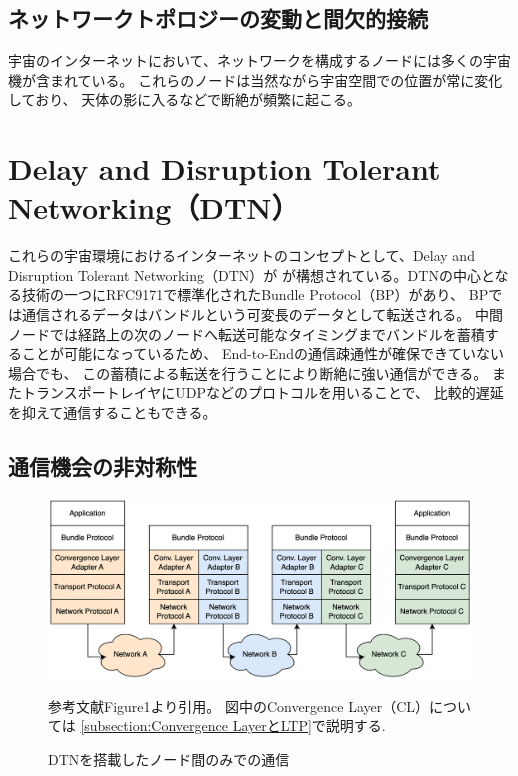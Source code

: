 \subsection{ネットワークトポロジーの変動と間欠的接続}
\label{subsection:ネットワークトポロジーの変動と間欠的接続}
宇宙のインターネットにおいて、ネットワークを構成するノードには多くの宇宙機が含まれている。
これらのノードは当然ながら宇宙空間での位置が常に変化しており、
 天体の影に入るなどで断絶が頻繁に起こる。 

\section{Delay and Disruption Tolerant Networking（DTN）}
これらの宇宙環境におけるインターネットのコンセプトとして、Delay and Disruption Tolerant Networking（DTN）が
が構想されている。DTNの中心となる技術の一つにRFC9171\cite{rfc9171}で標準化されたBundle Protocol（BP）があり、 
BPでは通信されるデータはバンドルという可変長のデータとして転送される。 
中間ノードでは経路上の次のノードへ転送可能なタイミングまでバンドルを蓄積することが可能になっているため、 
End-to-Endの通信疎通性が確保できていない場合でも、 この蓄積による転送を行うことにより断絶に強い通信ができる。
またトランスポートレイヤにUDPなどのプロトコルを用いることで、 比較的遅延を抑えて通信することもできる。\cite{bundle_protocol_architecture}

\subsection{通信機会の非対称性}
\label{subsection:通信機会の非対称性}

\begin{figure}[tbh]
    \centering
    \includegraphics[width=0.7\textheight]{img/dtnprotocolstack.pdf}
    \caption{DTNを搭載したノード間のみでの通信}
    \label{fig:dtnprotocolstack}
    \begin{minipage}{\textwidth}
        \raggedright
        \vspace{3mm}
        参考文献\cite{bundle_protocol_architecture}Figure1より引用。
        図中のConvergence Layer（CL）については
        \ref{subsection:Convergence LayerとLTP}で説明する.
    \end{minipage}
\end{figure}

